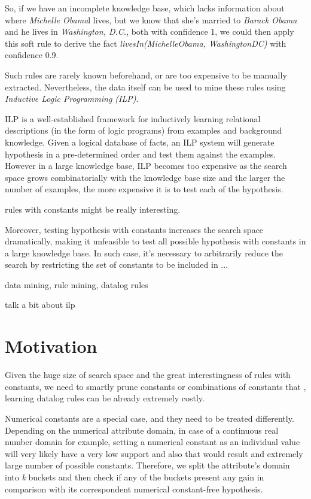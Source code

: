 So, if we have an incomplete knowledge base, which lacks information about where \emph{Michelle Obama}l lives, but we know that she's married to \emph{Barack Obama} and he lives in \emph{Washington, D.C.}, both with confidence 1, we could then apply this soft rule to derive the fact \emph{livesIn(MichelleObama, WashingtonDC)} with confidence 0.9.

Such rules are rarely known beforehand, or are too expensive to be manually extracted. Nevertheless, the data itself can be used to mine these rules using \emph{Inductive Logic Programming (ILP)}. 


ILP is a well-established framework for inductively learning relational descriptions (in the form of logic programs) from examples and background knowledge. Given a logical database of facts, an ILP system will generate hypothesis in a pre-determined order and test them against the examples. However in a large knowledge base, ILP becomes too expensive as the search space grows combinatorially with the knowledge base size and the larger the number of examples, the more expensive it is to test each of the hypothesis.

rules with constants might be really interesting.


Moreover, testing hypothesis with constants increases the search space dramatically, making it unfeasible to test all possible hypothesis with constants in a large knowledge base. In such case, it's necessary to arbitrarily reduce the search by restricting the set of constants to be included in ...

data mining, rule mining, datalog rules



talk a bit about ilp

\section{Motivation}
Given the huge size of search space and the great interestingness of rules with constants, we need to smartly prune constants or combinations of constants that  , learning datalog rules can be already extremely costly.

Numerical constants are a special case, and they need to be treated differently. Depending on the numerical attribute domain, in case of a continuous real number domain for example, setting a numerical constant as an individual value will very likely have a very low support and also that would result and extremely large number of possible constants. Therefore, we split the attribute's domain into \emph{k} buckets and then check if any of the buckets present any gain in comparison with its correspondent numerical constant-free hypothesis.


